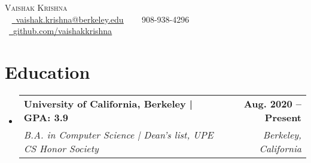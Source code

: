 \documentclass[letterpaper,11pt]{article}
\makeatletter
\newcommand{\resumeSubheading}[4]{
  \vspace{-2pt}\item
    \begin{tabular*}{1.0\textwidth}[t]{l@{\extracolsep{\fill}}r}
      \vspace{2pt}
      \textbf{\normalsize #1} & \textbf{\small #2} \\ 
      \textit{\small#3} & \textit{\small #4} \\
    \end{tabular*}\vspace{-5pt}
}
\newcommand{\resumeSubHeadingListStart}{\begin{itemize}[leftmargin=0.0in, label={}]}
\newcommand{\resumeSubHeadingListEnd}{\end{itemize}}
\makeatother
\begin{document}

\begin{center}
    {\Huge \scshape Vaishak Krishna} \\ \vspace{6pt}
    ~ \small \href{mailto:vaishak.krishna@berkeley.edu}{\raisebox{-0.2\height}\faEnvelope\  \underline{vaishak.krishna@berkeley.edu}} ~
    ~\small \raisebox{-0.1\height}\faPhone\ 908-938-4296 ~
    ~\href{https://github.com/vaishakkrishna}{\raisebox{-0.2\height}\faGithub\ \underline{github.com/vaishakkrishna}}~
    \vspace{-8pt}
\end{center}


\section{Education}
  \resumeSubHeadingListStart
    \resumeSubheading
  {University of California, Berkeley | GPA: 3.9}{Aug. 2020 -- Present}
      {B.A. in Computer Science | Dean's list, UPE CS Honor Society}{Berkeley, California}
  \resumeSubHeadingListEnd
  
\end{document}
